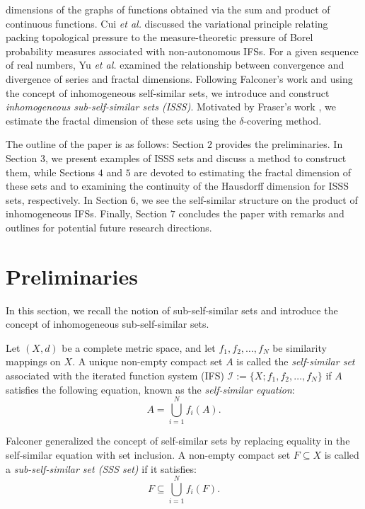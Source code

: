 \documentclass[12pt,oneside,reqno]{amsart}
\theoremstyle{definition}
\theoremstyle{remark}
\begin{document}
dimensions of the graphs of functions obtained via the sum and product of continuous functions. Cui \textit{et al.} \cite{Cui} discussed the variational principle relating packing topological pressure to the measure-theoretic pressure of Borel probability measures associated with non-autonomous IFSs. For a given sequence of real numbers, Yu \textit{et al.} \cite{Byu} examined the relationship between convergence and divergence of series and fractal dimensions. Following Falconer's work \cite{Fal1} and using the concept of inhomogeneous self-similar sets, we introduce and construct \textit{inhomogeneous sub-self-similar sets (ISSS)}. Motivated by Fraser's work \cite{Fraser1}, we estimate the fractal dimension of these sets using the $\delta$-covering method.

\par The outline of the paper is as follows: Section $2$ provides the preliminaries. In Section $3$, we present examples of ISSS sets and discuss a method to construct them, while Sections $4$ and $5$ are devoted to estimating the fractal dimension of these sets and to examining the continuity of the Hausdorff dimension for ISSS sets, respectively. In Section $6$, we see the self-similar structure on the product of inhomogeneous IFSs. Finally, Section $7$ concludes the paper with remarks and outlines for potential future research directions.
\par
 

\section{Preliminaries}\label{Section 2}
In this section, we recall the notion of sub-self-similar sets and introduce the concept of inhomogeneous sub-self-similar sets.

Let $(X, d)$ be a complete metric space, and let $f_1, f_2, \dots, f_N$ be similarity mappings on $X$. A unique non-empty compact set $A$ is called the \emph{self-similar set} associated with the iterated function system (IFS) $\mathcal{I} := \{X; f_1, f_2, \dots, f_N\}$ if $A$ satisfies the following equation, known as the \emph{self-similar equation}:
\begin{equation}\label{eq1}
A = \bigcup_{i=1}^N f_i(A).
\end{equation}

Falconer \cite{Fal1} generalized the concept of self-similar sets by replacing equality in the self-similar equation with set inclusion. A non-empty compact set $F \subseteq X$ is called a \emph{sub-self-similar set (SSS set)} if it satisfies:
\begin{equation}\label{eq2}
F \subseteq \bigcup_{i=1}^N f_i(F).
\end{equation}
\end{document}

